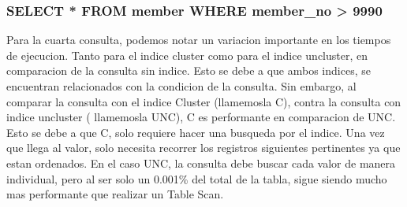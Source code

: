 \subsubsection{SELECT * FROM member WHERE member_no > 9990}
Para la cuarta consulta, podemos notar un variacion importante en los tiempos de ejecucion.
Tanto para el indice cluster como para el indice uncluster, en comparacion de la consulta
sin indice. Esto se debe a que ambos indices, se encuentran relacionados con la condicion 
de la consulta. Sin embargo, al comparar la consulta con el indice Cluster (llamemosla C), 
contra la consulta con indice uncluster ( llamemosla UNC), C es performante en comparacion 
de UNC. Esto se debe a que C, solo requiere hacer una busqueda por el indice. Una vez que 
llega al valor, solo necesita recorrer los registros siguientes pertinentes ya que estan 
ordenados. En el caso UNC, la consulta debe buscar cada valor de manera individual, pero al
ser solo un 0.001\% del total de la tabla, sigue siendo mucho mas performante que realizar 
un Table Scan.


